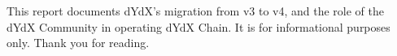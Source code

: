 \begin{fullwidth}
\begin{adjustwidth}{1cm}{1cm}
        \begin{center}
            \large
            This report documents dYdX's migration from v3 to v4, and the role of the dYdX Community in operating dYdX Chain. It is for informational purposes only. Thank you for reading.
        \end{center}
    
    \end{adjustwidth}

\end{fullwidth}